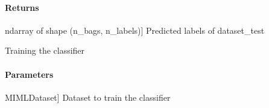 \documentclass[letterpaper,10pt,english]{sphinxmanual}
\begin{document}
\begin{fulllineitems}
\begin{fulllineitems}
\paragraph{Returns}
\label{\detokenize{classifier/mimlTOmi/_autosummary/miml.classifier.mimlTOmi.miml_to_mi_br_classifier.MIMLtoMIBRClassifier:returns}}\begin{description}
\sphinxlineitem{results}{[}ndarray of shape (n\_bags, n\_labels){]}
\sphinxAtStartPar
Predicted labels of dataset\_test

\end{description}

\end{fulllineitems}


\begin{fulllineitems}
\label{\detokenize{classifier/mimlTOmi/_autosummary/miml.classifier.mimlTOmi.miml_to_mi_br_classifier.MIMLtoMIBRClassifier:miml.classifier.mimlTOmi.miml_to_mi_br_classifier.MIMLtoMIBRClassifier.fit}}
\pysigstartsignatures
{}
\pysigstopsignatures
\sphinxAtStartPar
Training the classifier


\paragraph{Parameters}
\label{\detokenize{classifier/mimlTOmi/_autosummary/miml.classifier.mimlTOmi.miml_to_mi_br_classifier.MIMLtoMIBRClassifier:id1}}\begin{description}
\sphinxlineitem{dataset\_train}{[}MIMLDataset{]}
\sphinxAtStartPar
Dataset to train the classifier

\end{description}

\end{fulllineitems}



\end{fulllineitems}
\end{document}
